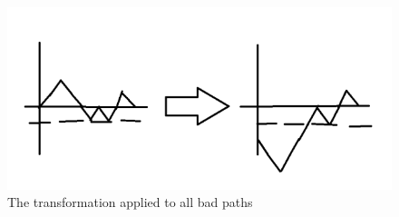 \begin{figure}
    \includegraphics[width=\linewidth]{figures/CatalanAgain.png}
    \caption{The transformation applied to all bad paths}
     \label{fig:hex4}
\end{figure}
% 
